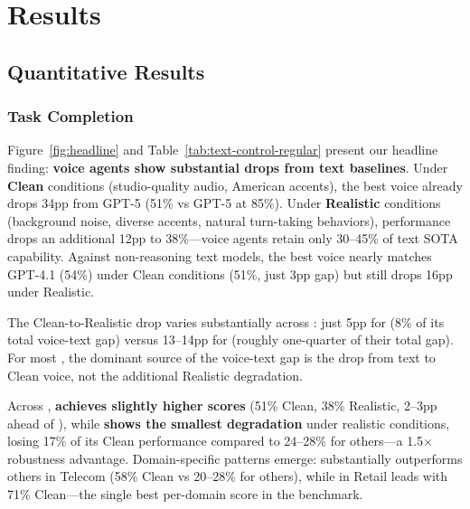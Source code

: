 \section{Results}
\label{sec:results}

\subsection{Quantitative Results}

\subsubsection{Task Completion}

Figure~\ref{fig:headline} and Table~\ref{tab:text-control-regular} present our headline finding: \textbf{voice agents show substantial drops from text baselines}. Under \textbf{Clean} conditions (studio-quality audio, American accents), the best voice  already drops 34pp from GPT-5 (51\% vs GPT-5 at 85\%). Under \textbf{Realistic} conditions (background noise, diverse accents, natural turn-taking behaviors), performance drops an additional 12pp to 38\%---voice agents retain only 30--45\% of text SOTA capability. Against non-reasoning text models, the best voice  nearly matches GPT-4.1 (54\%) under Clean conditions (51\%, just 3pp gap) but still drops 16pp under Realistic.

\begin{table}[h]
\caption{Text vs Voice comparison (pass@1). Text shows GPT-5 (reasoning) and GPT-4.1 (non-reasoning). Voice evaluated under Clean and Realistic conditions. Deltas show gap from GPT-5.}
\label{tab:text-control-regular}
\centering
\begin{small}
\resizebox{\columnwidth}{!}{%

}
\end{small}
\end{table}

The Clean-to-Realistic drop varies substantially across : just 5pp for  (8\% of its total voice-text gap) versus 13--14pp for  (roughly one-quarter of their total gap). For most , the dominant source of the voice-text gap is the drop from text to Clean voice, not the additional Realistic degradation.


Across , \textbf{ achieves slightly higher scores} (51\% Clean, 38\% Realistic, 2--3pp ahead of ), while \textbf{ shows the smallest degradation} under realistic conditions, losing 17\% of its Clean performance compared to 24--28\% for others---a 1.5$\times$ robustness advantage. Domain-specific patterns emerge:  substantially outperforms others in Telecom (58\% Clean vs 20--28\% for others), while in Retail  leads with 71\% Clean---the single best per-domain score in the benchmark.

